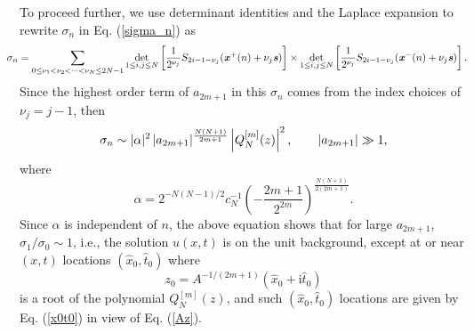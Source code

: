 \documentclass[amsmath,amssymb]{revtex4}
\def\[{\begin{equation}}
\def\]{\end{equation}}
\begin{document}
To proceed further, we use determinant identities and the Laplace expansion to rewrite $\sigma_n$ in Eq. (\ref{sigma_n}) as \cite{OhtaJY2012}
\begin{eqnarray} \label{sigmanLap}
&& \hspace{-0.8cm} \sigma_{n}=\sum_{0\leq\nu_{1} < \nu_{2} < \cdots < \nu_{N}\leq 2N-1}
\det_{1 \leq i, j\leq N} \left[\frac{1}{2^{\nu_j}} S_{2i-1-\nu_j}(\textbf{\emph{x}}^{+}(n) +\nu_j \textbf{\emph{s}}) \right]  \times \det_{1 \leq i, j\leq N}\left[\frac{1}{2^{\nu_j}}S_{2i-1-\nu_j}(\textbf{\emph{x}}^{-}(n) + \nu_j \textbf{\emph{s}})\right].
\end{eqnarray}
Since the highest order term of $a_{2m+1}$ in this $\sigma_n$ comes from the index choices of $\nu_{j}=j-1$, then
\begin{equation} \label{sigmanmax}
\sigma_n \sim |\alpha|^2 \hspace{0.05cm} |a_{2m+1}|^{\frac{N(N+1)}{2m+1}} \left|Q_{N}^{[m]}(z)\right|^2,
\quad \quad |a_{2m+1}| \gg 1,
\end{equation}
where
\[ \label{defalpha}
\alpha=2^{-N(N-1)/2}c_N^{-1} \left(-\frac{2m+1}{2^{2m}}\right)^{\frac{N(N+1)}{2(2m+1)}}.
\]
Since $\alpha$ is independent of $n$, the above equation shows that for large $a_{2m+1}$, $\sigma_1/\sigma_0\sim 1$, i.e., the solution $u(x,t)$ is on the unit background, except at or near $(x, t)$ locations $\left(\hat{x}_{0}, \hat{t}_{0}\right)$ where
\[  \label{z0def}
z_0=A^{-1/(2m+1)}(\hat{x}_{0}+\textrm{i}\hat{t}_{0})
\]
is a root of the polynomial $Q_{N}^{[m]}(z)$, and such $\left(\hat{x}_{0}, \hat{t}_{0}\right)$ locations are given by Eq. (\ref{x0t0}) in view of Eq. (\ref{Az}).
\end{document}
